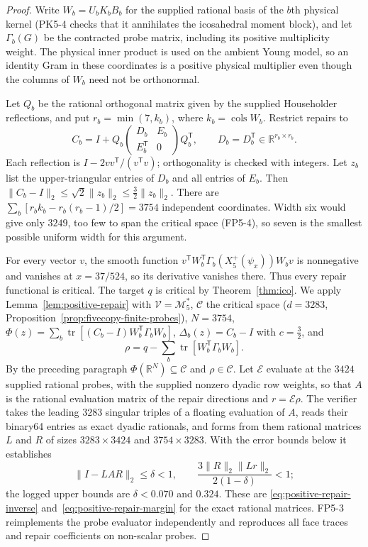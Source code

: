\begin{proof}
Write $W_b=U_bK_bB_b$ for the supplied rational basis of the $b$th
physical kernel (PK5-4 checks that it annihilates the icosahedral
moment block), and let $\Gamma_b(G)$ be the contracted probe matrix,
including its positive multiplicity weight. The physical inner product
is used on the ambient Young model, so an identity Gram in these
coordinates is a positive physical multiplier even though the columns of
$W_b$ need not be orthonormal.

Let $Q_b$ be the rational orthogonal matrix given by the supplied
Householder reflections, and put $r_b=\min(7,k_b)$, where
$k_b=\operatorname{cols}W_b$. Restrict repairs to
\[
 C_b=I+Q_b\begin{pmatrix}D_b&E_b\\E_b^{\mathsf T}&0\end{pmatrix}Q_b^{\mathsf T},
 \qquad D_b=D_b^{\mathsf T}\in\mathbb R^{r_b\times r_b}.
\]
Each reflection is $I-2vv^{\mathsf T}/(v^{\mathsf T}v)$; orthogonality is
checked with integers. Let $z_b$ list the upper-triangular entries of $D_b$
and all entries of $E_b$. Then
$\|C_b-I\|_2\le\sqrt2\|z_b\|_2\le\tfrac32\|z_b\|_2$.
There are $\sum_b[r_bk_b-r_b(r_b-1)/2]=3754$ independent coordinates.
Width six would give only $3249$, too few to span the critical space
(FP5-4), so seven is the smallest possible uniform width for this argument.

For every vector $v$, the smooth function
$v^{\mathsf T}W_b^{\mathsf T}\Gamma_b(X_5^+(\psi_x))W_bv$ is
nonnegative and vanishes at $x=37/524$, so its derivative vanishes there.
Thus every repair functional is critical. The target $q$ is critical by
Theorem~\ref{thm:ico}.
We apply Lemma~\ref{lem:positive-repair} with $\mathcal V=\mathcal M_5^*$,
$\mathcal C$ the critical space ($d=3283$, Proposition~\ref{prop:fivecopy-finite-probes}),
$N=3754$, $\Phi(z)=\sum_b\operatorname{tr}[(C_b-I)W_b^{\mathsf T}\Gamma_bW_b]$,
$\Delta_b(z)=C_b-I$ with $c=\tfrac32$, and
\[
 \rho=q-\sum_b\operatorname{tr}[W_b^{\mathsf T}\Gamma_bW_b].
\]
By the preceding paragraph $\Phi(\mathbb R^N)\subseteq\mathcal C$ and $\rho\in\mathcal C$.
Let $\mathcal E$ evaluate at the $3424$ supplied rational probes,
with the supplied nonzero dyadic row weights, so that $A$ is the rational evaluation
matrix of the repair directions and $r=\mathcal E\rho$.
The verifier takes the leading $3283$ singular triples of a floating
evaluation of $A$, reads their binary64 entries as exact dyadic
rationals, and forms from them rational matrices $L$ and $R$ of sizes
$3283\times3424$ and $3754\times3283$. With the error bounds below it
establishes
\begin{equation}\label{eq:fivecopy-verified-repair}
 \|I-LAR\|_2\le\delta<1,\qquad
 \frac{3\|R\|_2\|Lr\|_2}{2(1-\delta)}<1 ;
\end{equation}
the logged upper bounds are $\delta<0.070$ and $0.324$. These are
\eqref{eq:positive-repair-inverse} and~\eqref{eq:positive-repair-margin}
for the exact rational matrices. FP5-3 reimplements the probe evaluator independently and
reproduces all face traces and repair coefficients on non-scalar probes.


\end{proof}
